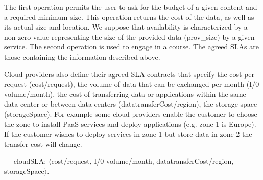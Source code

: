 %

\color{red}

The first operation permits the user to ask for the budget of a given  content and a required minimum size.
This operation  returns the cost of the data, as well as its actual size and location.
We suppose that availability is characterized by a non-zero value representing the size of the provided data ({\sf prov\_size}) by a given service.
The second operation is used to engage in a course. 
The agreed SLAs are those containing the information described above.



Cloud providers also define their agreed SLA contracts that specify the cost per request ({\sf cost/request}), the volume of data that can be exchanged per month ({\sf I/0 volume/month}), the cost of transferring data or applications within the same data center or between data centers ({\sf datatransferCost/region}), the storage space ({\sf storageSpace}). For example some cloud providers enable the customer to choose the zone to install PaaS services and deploy applications (e.g. zone 1 is Europe). If the customer wishes to deploy services in zone 1 but store data in zone 2 the transfer cost will change.

\begin{trivlist}\sf\footnotesize
 \item[~-~cloudSLA:]  $\langle$cost/request, I/0 volume/month, datatransferCost/region, storageSpace$\rangle$.
 \end{trivlist}
 

